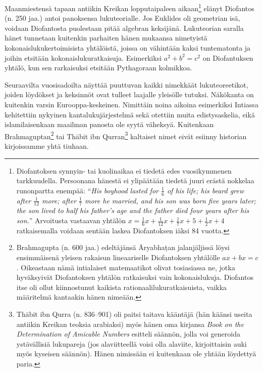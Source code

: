 \documentclass[a4paper,11pt]{article}
\begin{document}
Maanmiestensä tapaan antiikin Kreikan lopputaipaleen aikaan\footnote{Diofantoksen synnyin- tai kuolinaikaa ei tiedetä edes vuosikymmenen tarkkuudella. Persoonana hänestä ei ylipäätään tiedetä juuri erästä nokkelaa runonpartta enempää: \enquote{\textit{His boyhood lasted for $\frac{1}{6}$ of his life; his beard grew after $\frac{1}{12}$ more; after $\frac{1}{7}$ more he married, and his son was born five years later; the son lived to half his father’s age and the father died four years after his son.}}\cite{Burton}  Arvoitusta vastaavan yhtälön $x=\frac{1}{6}x+\frac{1}{12}x+\frac{1}{7}x+5+\frac{1}{2}x+4$ ratkaisemalla voidaan sentään laskea Diofantoksen iäksi 84 vuotta.} elänyt Diofantos (n. 250 jaa.) antoi panoksensa lukuteorialle. Jos Euklides oli geometrian isä, voidaan Diofantosta puolestaan pitää algebran keksijänä. Lukuteorian saralla hänet tunnetaan kuitenkin parhaiten hänen mukaansa nimetyistä kokonaislukukertoimisista yhtälöistä, joissa on vähintään kaksi tuntematonta ja joihin etsitään kokonaislukuratkaisuja. Esimerkiksi $a^2+b^2=c^2$ on Diofantuksen yhtälö, kun sen rarkaisuksi etsitään Pythagoraan kolmikkoa.

Seuraavilta vuosisadoilta näyttää puuttuvan kaikki nimekkäät lukuteoreetikot, joiden löydökset ja keksinnöt ovat tulleet laajalle yleisölle tutuksi. Näkökanta on kuitenkin varsin Eurooppa-keskeinen. Nimittäin noina aikoina esimerkiksi Intiassa kehitettiin nykyinen kantalukujärjestelmä sekä otettiin muita edistysaskelia, eikä islamilaisenkaan maailman panosta ole syytä väheksyä. Kuitenkaan Brahmaguptan\footnote{Brahmagupta (n. 600 jaa.) edeltäjänsä Āryabhaṭan jalanjäljissä löysi ensimmäisenä yleisen rakaisun lineaariselle Diofantoksen yhtälölle $ax+bx=c$. Oikeastaan nämä intialaiset matemaatikot olivat tosiasiassa ne, jotka hyväksyivät Diofantoksen yhtälön ratkaisuksi vain kokonaislukuja. Diofantos itse oli ollut kiinnostunut kaikista rationaalilukuratkaisuista, vaikka määritelmä kantaakin hänen nimeään.\cite{Burton}} tai Thābit ibn Qurran\footnote{Thābit ibn
Qurra (n. 836–901) oli paitsi taitava kääntäjä (hän käänsi useita antiikin Kreikan teoksia arabiaksi) myös hänen oma kirjansa \textit{Book on the Determination of Amicable Numbers} esitteli säännön, jolla voi generoida ystävällisiä lukupareja (jos alaviitteellä voisi olla alaviite, kirjoittaisin auki myös kyseisen säännön). Hänen nimissään ei kuitenkaan ole yhtään löydettyä paria.} kaltaiset nimet eivät esiinny historian kirjoissamme yhtä tiuhaan.
\end{document}
